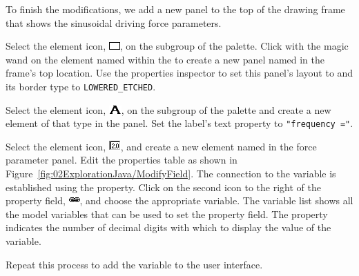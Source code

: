 To finish the modifications, we add a new panel to the top of the drawing frame that shows the sinusoidal driving force parameters.

\begin{bulletlist}

\item Select the  element icon, \includegraphics[scale=\linescale]{../_common/icons_png/Elements/Panel.png}, on the  subgroup of the  palette. Click with the magic wand on the element named  within the  to create a new panel named  in the frame's top location. Use the properties inspector to set this panel's layout to  and its border type to \texttt{LOWERED\_ETCHED}.
\item Select the  element icon, \includegraphics[scale=\linescale]{../_common/icons_png/Elements/Label.png}, on the  subgroup of the  palette and create a new element of that type in the  panel.  Set the label's text property to \texttt{"frequency ="}.
\item Select the  element icon, \includegraphics[scale=\linescale]{../_common/icons_png/Elements/ParsedField.png}, and create a new element named  in the force parameter panel.  Edit the  properties table as shown in Figure~\ref{fig:02ExplorationJava/ModifyField}. The connection to the  variable is established using the  property.  Click on the second icon to the right of the property field, \includegraphics[scale=\linescale]{../_common/icons_png/link.png}, and choose the appropriate variable. The variable list shows all the model variables that can be used to set the property field. The  property indicates the number of decimal digits with which to display the value of the variable.
\item Repeat this process to add the  variable to the user interface.
\end{bulletlist}

